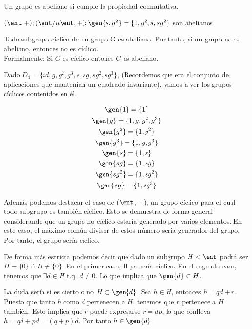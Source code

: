 \documentclass[nochap]{apuntes}
\begin{document}
  \begin{defn}
   Un grupo es abeliano si cumple la propiedad conmutativa.
  \end{defn}

  \begin{example}  $(\ent, +); (\ent/n\ent, +); \gen{s,g^{2}} =\{1,g^{2},s,sg^{2}\}$ son abelianos
  \end{example}
  
  \begin{lemma}
   Todo subgrupo cíclico de un grupo G es abeliano. Por tanto, si un grupo no es abeliano, entonces no es cíclico.\\
   Formalmente: Si $G$ es cíclico entones $G$ es abeliano.
  \end{lemma}

  \begin{example}
   Dado $D_{4}=\{id, g, g^{2}, g^{3}, s, sg, sg^{2},sg^{3}\}$, (Recordemos que era el conjunto de aplicaciones que mantenían un cuadrado invariante), vamos a ver los grupos cíclicos contenidos en él.
   
  \begin{gather*}
  \gen{1}=\{1\} \\
  \gen{g} =\{1,g,g^{2}, g^{3}\}\\
  \gen{g^{2}}=\{1,g^{2}\}\\
  \gen{g^{3}}=\{1,g, g^{3}\}\\
  \gen{s} =\{1,s\}\\
  \gen{sg}=\{1, sg\}\\
  \gen{sg^{2}} =\{1, sg^{2}\}\\
  \gen{sg}=\{1, sg^{3}\}
  \end{gather*}
   
   Además podemos destacar el caso de ($\ent$, +), un grupo cíclico para el cual todo subgrupo es también cíclico. Esto se demuestra
   de forma general considerando que un grupo no cíclico estaría generado por varios elementos. En este caso, el máximo común
   divisor de estos número sería generador del grupo. Por tanto, el grupo sería cíclico.
 
   De forma más estricta podemos decir que dado un subgrupo $H<\ent$ podrá ser $H=\{0\}$ ó $H\neq\{0\}$. 
   En el primer caso, H ya sería cíclico. En el segundo caso, tenemos que $\exists  d \in  H$ t.q. $d\neq 0$. Lo que implica
   que $\gen{d} \subset H$. 
   
   La duda sería si es cierto o no $H\subset \gen{d}$. Sea $h \in H$, entonces $h=qd+r$. Puesto que tanto $h$ como $d$ pertenecen a $H$,
   tenemos que $r$ pertenece a $H$ también. Esto implica que $r$ puede expresarse $r=dp$, lo que conlleva $h=qd+pd=(q+p)d$. Por tanto $h \in \gen{d}$.
  \end{example}
\end{document}
